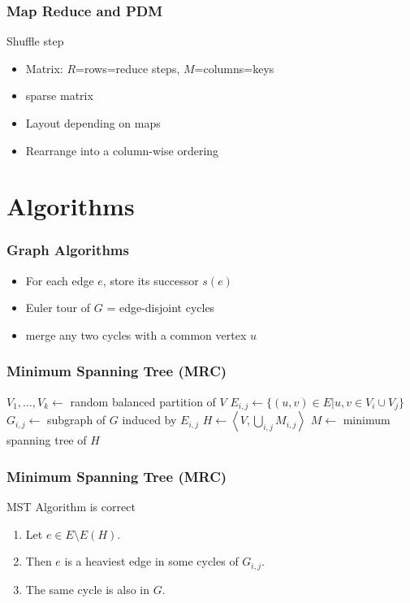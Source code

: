 \documentclass[12pt,aspectratio=169]{beamer}
\begin{document}
\begin{frame}\frametitle{Map Reduce and PDM}
  \begin{block}{Shuffle step}
  \begin{itemize}
  \item
    Matrix: $R$=rows=reduce steps, $M$=columns=keys
  \item
    sparse matrix
  \item
    Layout depending on maps
  \item
    Rearrange into a column-wise ordering
  \end{itemize}
\end{block}
\end{frame}



\section{Algorithms}



\begin{frame}\frametitle{Graph Algorithms}
  \begin{itemize}
  \item
    For each edge $e$, store its successor $s(e)$
  \item
    Euler tour of $G$ = edge-disjoint cycles
  \item
    merge any two cycles with a common vertex $u$
  \end{itemize}
\end{frame}

\begin{frame}\frametitle{Minimum Spanning Tree (MRC)}
  \begin{algorithm}[H]

    $V_{1}, \ldots, V_{k} \gets $ random balanced partition of $V$\;
    $E_{i,j} \gets \{(u, v) \in E | u, v \in V_{i} \cup V_{j} \}$\;
    $G_{i,j} \gets $ subgraph of $G$ induced by $E_{i,j}$\;
    $H \gets \left\langle V, \bigcup_{i,j} M_{i,j}\right\rangle $\;
    $M \gets$ minimum spanning tree of $H$\;
    \label{alg:MRC-MST}
    \caption{MST}
  \end{algorithm}
\end{frame}

\begin{frame}\frametitle{Minimum Spanning Tree (MRC)}
  \begin{block}{MST Algorithm is correct}
    \begin{enumerate}
      \item
    Let $e\in E\setminus E(H)$.
      \item
    Then $e$ is a heaviest edge in some cycles of $G_{i,j}$.
      \item
    The same cycle is also in $G$.
  \end{enumerate}
\end{block}
\end{frame}
\end{document}
